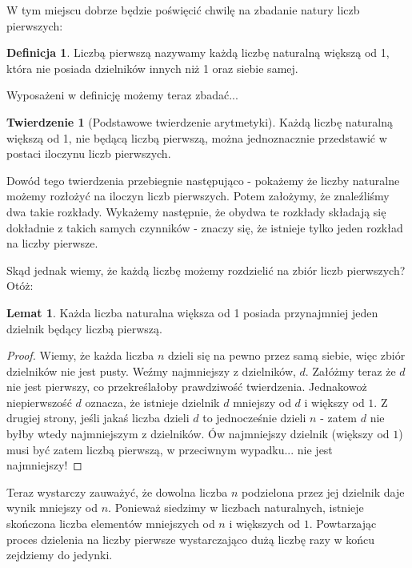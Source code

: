 \documentclass[11pt]{article}
\theoremstyle{definition}
\newtheorem{theorem}{Twierdzenie}
\newtheorem{definition}{Definicja}
\newtheorem{lemma}{Lemat}
\begin{document}
W tym miejscu dobrze będzie poświęcić chwilę na zbadanie natury liczb pierwszych:

\begin{definition}
Liczbą pierwszą nazywamy każdą liczbę naturalną większą od 1, która nie posiada dzielników innych niż 1 oraz siebie samej.
\end{definition}

Wyposażeni w definicję możemy teraz zbadać...

\begin{theorem}[Podstawowe twierdzenie arytmetyki] Każdą liczbę naturalną większą od 1, nie będącą liczbą pierwszą, można jednoznacznie przedstawić w postaci iloczynu liczb pierwszych.
\end{theorem}

Dowód tego twierdzenia przebiegnie następująco - pokażemy że liczby naturalne możemy rozłożyć na iloczyn liczb pierwszych. Potem założymy, że znaleźliśmy dwa takie rozkłady. Wykażemy następnie, że obydwa te rozkłady składają się dokładnie z takich samych czynników - znaczy się, że istnieje tylko jeden rozkład na liczby pierwsze.

Skąd jednak wiemy, że każdą liczbę możemy rozdzielić na zbiór liczb pierwszych? Otóż:

\begin{lemma}
Każda liczba naturalna większa od 1 posiada przynajmniej jeden dzielnik będący liczbą pierwszą.
\end{lemma}
\begin{proof}
Wiemy, że każda liczba $n$ dzieli się na pewno przez samą siebie, więc zbiór dzielników nie jest pusty. Weźmy najmniejszy z dzielników, $d$. Załóżmy teraz że $d$ nie jest pierwszy, co przekreślałoby prawdziwość twierdzenia. Jednakowoż niepierwszość $d$ oznacza, że istnieje dzielnik $d$ mniejszy od $d$ i większy od $1$. Z drugiej strony, jeśli jakaś liczba dzieli $d$ to jednocześnie dzieli $n$ - zatem $d$ nie byłby wtedy najmniejszym z dzielników. Ów najmniejszy dzielnik (większy od $1$) musi być zatem liczbą pierwszą, w przeciwnym wypadku... nie jest najmniejszy!
\end{proof}

Teraz wystarczy zauważyć, że dowolna liczba $n$ podzielona przez jej dzielnik daje wynik mniejszy od $n$. Ponieważ siedzimy w liczbach naturalnych, istnieje skończona liczba elementów mniejszych od $n$ i większych od $1$. Powtarzając proces dzielenia na liczby pierwsze wystarczająco dużą liczbę razy w końcu zejdziemy do jedynki.
\end{document}
